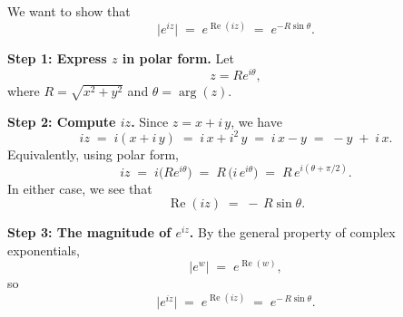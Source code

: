 \documentclass[12pt]{article}
\title{}
\author{Jerich Lee}
\date{\today}
\theoremstyle{definition} %
\theoremstyle{plain} %
\begin{document}
\maketitle
We want to show that
\[
\lvert e^{iz}\rvert \;=\; e^{\operatorname{Re}(iz)} \;=\; e^{-R\sin\theta}.
\]

\textbf{Step 1: Express $z$ in polar form.}  
Let
\[
z = R e^{i\theta},
\]
where \(R = \sqrt{x^2 + y^2}\) and \(\theta = \arg(z)\).

\textbf{Step 2: Compute $iz$.}  
Since \(z = x + i\,y\), we have
\[
iz \;=\; i(x + i\,y) 
\;=\; i\,x + i^2\,y 
\;=\; i\,x - y 
\;=\; -y \;+\; i\,x.
\]
Equivalently, using polar form,
\[
iz 
\;=\;
i \bigl(R e^{i\theta}\bigr)
\;=\;
R\,\bigl(i\,e^{i\theta}\bigr)
\;=\;
R\,e^{i(\theta + \pi/2)}.
\]
In either case, we see that
\[
\operatorname{Re}(iz) 
\;=\; -\,R\sin\theta.
\]

\textbf{Step 3: The magnitude of $e^{iz}$.}  
By the general property of complex exponentials,
\[
\lvert e^{w}\rvert 
\;=\;
e^{\operatorname{Re}(w)},
\]
so
\[
\lvert e^{iz}\rvert 
\;=\;
e^{\operatorname{Re}(iz)} 
\;=\;
e^{-\,R\sin\theta}.
\]
\end{document}
